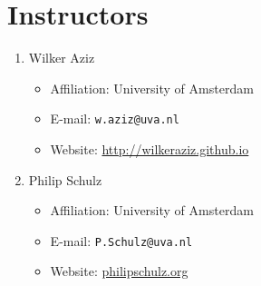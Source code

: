 \section{Instructors}

\begin{enumerate}
\item Wilker Aziz
\begin{itemize}
\item Affiliation: University of Amsterdam
\item E-mail: \texttt{w.aziz@uva.nl}
\item Website: \url{http://wilkeraziz.github.io}
\end{itemize}
\item Philip Schulz
\begin{itemize}
\item Affiliation: University of Amsterdam
\item E-mail: \texttt{P.Schulz@uva.nl}
\item Website: \url{philipschulz.org}
\end{itemize}
\end{enumerate}